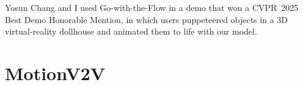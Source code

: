 Yosun Chang and I used Go-with-the-Flow in a demo that won a CVPR~2025 Best Demo Honorable Mention, in which users puppeteered objects in a 3D virtual-reality dollhouse and animated them to life with our model.


\section{MotionV2V}



